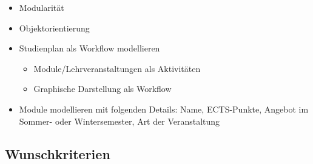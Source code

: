\begin{itemize}[nosep]
	\item Modularität
	\item Objektorientierung
	\item Studienplan als Workflow modellieren
	\begin{itemize}[nosep]
		\item Module/Lehrveranstaltungen als Aktivitäten
		\item Graphische Darstellung als Workflow
	\end{itemize}
	\item Module modellieren mit folgenden Details: Name, ECTS-Punkte, Angebot im Sommer- oder Wintersemester, Art der Veranstaltung
\end{itemize}

\subsection{Wunschkriterien}
